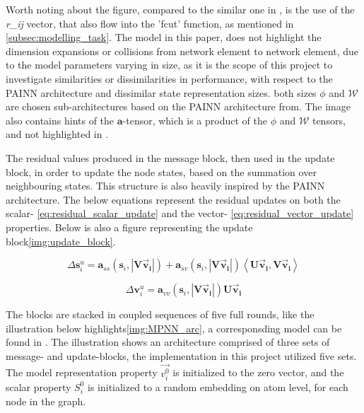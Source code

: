 Worth noting about the figure, compared to the similar one in \cite{PAINN}, is the use of the \textit{r\_ij} vector, that also flow into
the 'fcut' function, as mentioned in \ref{subsec:modelling_task}. The model in this paper, does not highlight the dimension expansions
or collisions from network element to network element, due to the model parameters varying in size, as it is the scope of this project
to investigate similarities or dissimilarities in performance, with respect to the PAINN architecture and dissimilar state representation
sizes. both sizes $\phi$ and $\mathcal{W}$ are chosen sub-architectures based on the PAINN architecture from\cite{PAINN}. The image
also contains hints of the $\mathbf{a}$-tensor, which is a product of the $\phi$ and $\mathcal{W}$ tensors, and not highlighted in \cite{PAINN}.

The residual values produced in the message block, then used in the update block, in order to update the node states,
based on the summation over neighbouring states.
This structure is also heavily inspired by the PAINN architecture\cite{PAINN}. The below equations represent the residual updates
on both the scalar- \ref{eq:residual_scalar_update} and the vector- \ref{eq:residual_vector_update} properties. Below is also
a figure representing the update block\ref{img:update_block}.

\begin{equation}\label{eq:residual_scalar_update}
    \Delta \mathbf{s}_{i}^{u}= \mathbf{a}_{ss} \left ( \mathbf{s}_{i}, \left | \mathbf{V\vec{v}_{i}} \right | \right ) + \mathbf{a}_{sv} \left ( \mathbf{s}_{i}, \left | \mathbf{V\vec{v}_{i}} \right | \right ) \left \langle \mathbf{U\vec{v}_{i}}, \mathbf{V \vec{v}_{i}} \right \rangle
\end{equation}

\begin{equation}\label{eq:residual_vector_update}
    \Delta \mathbf{v}_{i}^{u}= \mathbf{a}_{vv} \left ( \mathbf{s}_{i}, \left | \mathbf{V\vec{v}_{i}} \right | \right ) \mathbf{U\vec{v}_{i}}
\end{equation}



The blocks are stacked in coupled sequences of five full rounds, like the illustration below highlights\ref{img:MPNN_arc}, a corresponsding model can be found
in \cite{PAINN}. The illustration shows an architecture comprised of three sets of message- and update-blocks, the implementation in this project utilized
five sets. The model representation property $\vec{v_i^{0}}$ is initialized to the zero vector, and the scalar property $S_{i}^{0}$
is initialized to a random embedding on atom level, for each node in the graph.



